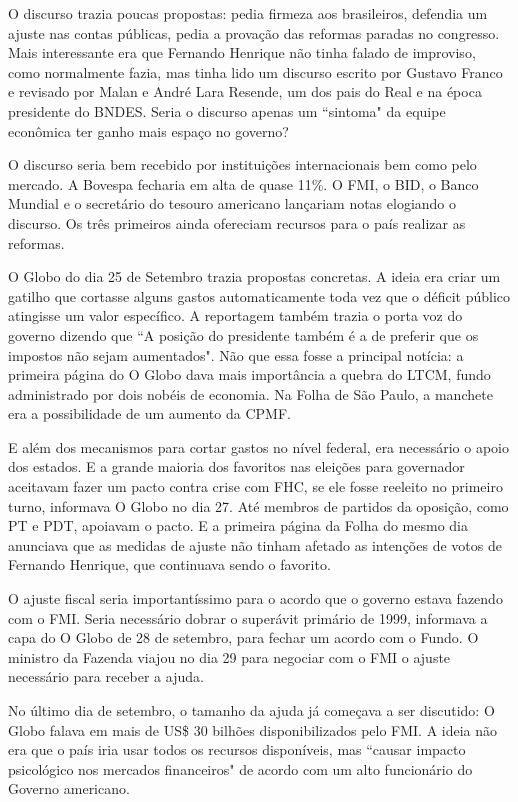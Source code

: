 \documentclass{article}
\begin{document}
O discurso trazia poucas propostas: pedia firmeza aos brasileiros, defendia um ajuste nas contas públicas, pedia a provação das reformas paradas no congresso. Mais interessante era que Fernando Henrique não tinha falado de improviso, como normalmente fazia, mas tinha lido um discurso escrito por Gustavo Franco e revisado por Malan e André Lara Resende, um dos pais do Real e na época presidente do BNDES. Seria o discurso apenas um ``sintoma" da equipe econômica ter ganho mais espaço no governo?

O discurso seria bem recebido por instituições internacionais bem como pelo mercado. A Bovespa fecharia em alta de quase 11\%. O FMI, o BID, o Banco Mundial e o secretário do tesouro americano lançariam notas elogiando o discurso. Os três primeiros ainda ofereciam recursos para o país realizar as reformas.              

O Globo do dia 25 de Setembro trazia propostas concretas. A ideia era criar um gatilho que cortasse alguns gastos automaticamente toda vez que o déficit público atingisse um valor específico. A reportagem também trazia o porta voz do governo dizendo que ``A posição do presidente também é a de preferir que os impostos não sejam aumentados". Não que essa fosse a principal notícia: a primeira página do O Globo dava mais importância a quebra do LTCM, fundo administrado por dois nobéis de economia. Na Folha de São Paulo, a manchete era a possibilidade de um aumento da CPMF.


E além dos mecanismos para cortar gastos no nível federal, era necessário o apoio dos estados. E a grande maioria dos favoritos nas eleições para governador aceitavam fazer um pacto contra crise com FHC, se ele fosse reeleito no primeiro turno, informava O Globo no dia 27. Até membros de partidos da oposição, como PT e PDT, apoiavam o pacto. E a primeira página da Folha do mesmo dia anunciava que as medidas de ajuste não tinham afetado as intenções de votos de Fernando Henrique, que continuava sendo o favorito.

O ajuste fiscal seria importantíssimo para o acordo que o governo estava fazendo com o FMI. Seria necessário dobrar o superávit primário de 1999, informava a capa do O Globo de 28 de setembro, para fechar um acordo com o Fundo. O ministro da Fazenda viajou no dia 29 para negociar com o FMI o ajuste necessário para receber a ajuda.

No último dia de setembro, o tamanho da ajuda já começava a ser discutido: O Globo falava em mais de US\$ 30 bilhões disponibilizados pelo FMI. A ideia não era que o país iria usar todos os recursos disponíveis, mas ``causar impacto psicológico nos mercados financeiros" de acordo com um alto funcionário do Governo americano. 
\end{document}
